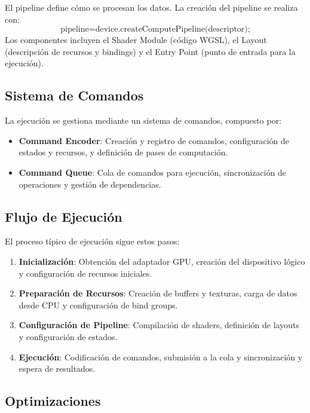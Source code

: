 El pipeline define cómo se procesan los datos. La creación del pipeline se realiza con:
\begin{equation}
    \text{pipeline} = \text{device.createComputePipeline(descriptor);}
\end{equation}
Los componentes incluyen el Shader Module (código WGSL), el Layout (descripción de recursos y bindings) y el Entry Point (punto de entrada para la ejecución).

\subsection{Sistema de Comandos}
\label{subsec:command-system}

La ejecución se gestiona mediante un sistema de comandos, compuesto por:
\begin{itemize}
    \item \textbf{Command Encoder}: Creación y registro de comandos, configuración de estados y recursos, y definición de pases de computación.
    \item \textbf{Command Queue}: Cola de comandos para ejecución, sincronización de operaciones y gestión de dependencias.
\end{itemize}

\subsection{Flujo de Ejecución}
\label{subsec:execution-flow}

El proceso típico de ejecución sigue estos pasos:
\begin{enumerate}
    \item \textbf{Inicialización}: Obtención del adaptador GPU, creación del dispositivo lógico y configuración de recursos iniciales.
    \item \textbf{Preparación de Recursos}: Creación de buffers y texturas, carga de datos desde CPU y configuración de bind groups.
    \item \textbf{Configuración de Pipeline}: Compilación de shaders, definición de layouts y configuración de estados.
    \item \textbf{Ejecución}: Codificación de comandos, submisión a la cola y sincronización y espera de resultados.
\end{enumerate}

\subsection{Optimizaciones}
\label{subsec:optimizations}

